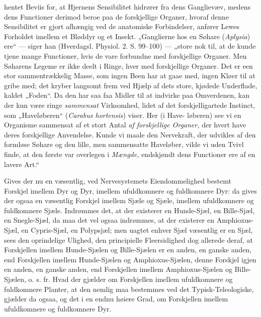 \documentclass[12pt,a4paper]{book}
\begin{document}
hentet Beviis for, at Hjernens Sensibilitet hidrører fra dens Ganglievæv, medens
dens Functioner derimod beroe paa de forskjellige Organer, hvoraf denne
Sensibilitet er gjort afhængig ved de anatomiske Forbindelser, anfører Lewes
Forholdet imellem et Bløddyr og et Insekt. „Ganglierne hos en Søhare
(\textit{Aplysia}) ere“ --- siger han (Hverdagsl. Physiol. 2. S. 99--100) ---
„store nok til, at de kunde tjene mange Functioner, hvis de vare forbundne med
forskjellige Organer. Men Søharens Legeme er ikke deelt i Ringe, hver med
forskjellige Organer. Det er een stor sammentrækkelig Masse, som ingen Been har
at gaae med, ingen Kløer til at gribe med; det kryber langsomt frem ved Hjælp af
dets store, kjødede Underflade, kaldet „Foden“. Da den har saa faa Midler til at
indvirke paa Omverdenen, kan der kun være ringe \emph{sammensat} Virksomhed,
lidet af det forskjelligartede Instinct, som „Haveløberen“ (\textit{Carabus
hortensis}) viser. Her (i Have-
løberen) see vi en Organisme sammensat af et stort Antal \emph{af forskjellige
Organer,} der hvert have deres forskjellige Anvendelse. Kunde vi maale den
Nervekraft, der udvikles af den formløse Søhare og den lille, men sammensatte
Haveløber, vilde vi uden Tvivl finde, at den første var overlegen i
\emph{Mængde,} endskjøndt dens Functioner ere af en lavere Art.“

Gives der nu en væsentlig, ved Nervesystemets Eiendommelighed bestemt Forskjel
imellem Dyr og Dyr, imellem ufuldkomnere og fuldkomnere Dyr: da gives der ogsaa
en væsentlig Forskjel imellem Sjæle og Sjæle, imellem ufuldkomnere og
fuldkomnere Sjæle. Indrømmes det, at der existerer en Hunde-Sjæl, en Bille-Sjæl,
en Snegle-Sjæl, da maa det vel ogsaa indrømmes, at der existerer en
Amphioxus-Sjæl, en Cypris-Sjæl, en Polypsjæl; men uagtet enhver Sjæl væsentlig
er en Sjæl, sees den oprindelige Ulighed, den principielle Fleersidighed dog
allerede deraf, at Forskjellen imellem Hunde-Sjælen og Bille-Sjælen er en anden,
en ganske anden, end Forskjellen imellem Hunde-Sjælen og Amphioxus-Sjælen, denne
Forskjel igjen en anden, en ganske anden, end Forskjellen imellem
Amphioxus-Sjælen og Bille-Sjælen, o. s. fr. Hvad der gjælder om Forskjellen
imellem ufuldkomnere og fuldkomnere Planter, at den nemlig maa bestemmes ved det
Typisk-Teleologiske, gjælder da ogsaa, og det i en endnu høiere Grad, om
Forskjellen imellem ufuldkomnere og fuldkomnere Dyr.
\end{document}
